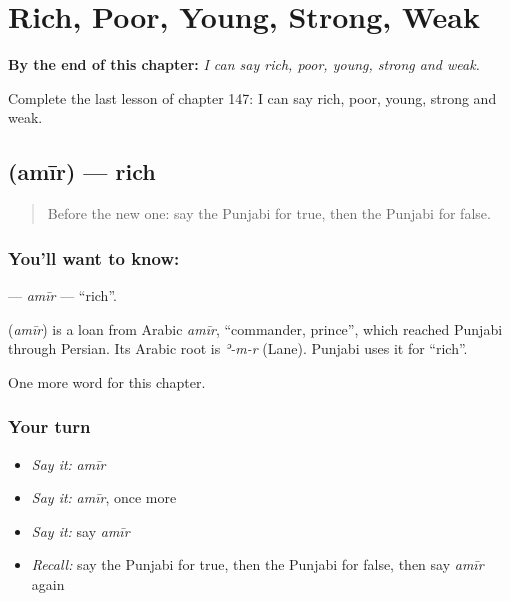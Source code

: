 
\chapter{Rich, Poor, Young, Strong, Weak}
\label{ch:pa-rich-poor-young-strong-weak}

\begin{chapteropening}
\textbf{By the end of this chapter:} \emph{I can say rich, poor, young, strong and weak.}

Complete the last lesson of chapter 147: I can say rich, poor, young, strong and weak.
\end{chapteropening}

\section[\texorpdfstring{\pa{ਅਮੀਰ} (amīr)}{ਅਮੀਰ (amīr)}]{ (amīr) — rich}

\label{lesson:PA-C147-amir}



\begin{quote}
Before the new one: say the Punjabi for true, then the Punjabi for false.
\end{quote}

\subsection*{You'll want to know: }
\textbf{} — \emph{amīr} — \textquotedblleft{}rich\textquotedblright{}.

\begin{cousinweb}
\textbf{} (\emph{amīr}) is a loan from Arabic \emph{amīr}, \textquotedblleft{}commander, prince\textquotedblright{}, which reached Punjabi through Persian. Its Arabic root is \emph{ʾ-m-r} (Lane). Punjabi uses it for \textquotedblleft{}rich\textquotedblright{}.
\end{cousinweb}

\begin{grammarlens}[title={What you've built}]
One more word for this chapter.
\end{grammarlens}

\subsection*{Your turn}
\begin{itemize}
\raggedright
  \item \emph{Say it:} \emph{amīr}
  \item \emph{Say it:} \emph{amīr}, once more
  \item \emph{Say it:} say \emph{amīr}
  \item \emph{Recall:} say the Punjabi for true, then the Punjabi for false, then say \emph{amīr} again
\end{itemize}

